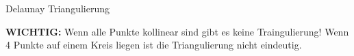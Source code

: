 

\begin{algorithm}[optional]{Delaunay Triangulierung}
	\begin{methods}
	\end{methods}
	\textbf{WICHTIG:} Wenn alle Punkte kollinear sind gibt es keine Traingulierung! Wenn 4 Punkte auf einem Kreis liegen ist die Triangulierung nicht eindeutig.
\end{algorithm}

